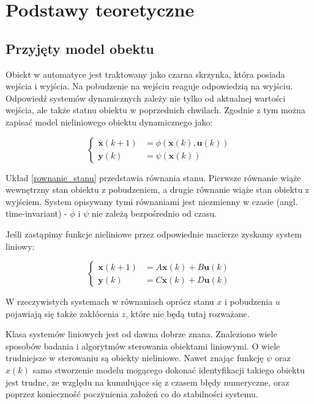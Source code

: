 \documentclass{article}
\newcommand{\bb}{\textbf}
\begin{document}
\section{Podstawy teoretyczne}

\subsection{Przyjęty model obektu}

Obiekt w automatyce jest traktowany jako czarna skrzynka, która posiada wejścia i wyjścia. Na pobudzenie na wejściu reaguje odpowiedzią na wyjściu. Odpowiedź systemów dynamicznych zależy nie tylko od aktualnej wartości wejścia, ale także statnu obiektu w poprzednich chwilach. Zgodnie z tym można zapisać model nieliniowego obiektu dynamicznego jako:

\begin{equation}
\left\{	
\begin{array}{ll}
	\bb{x}(k+1) &= \phi (\bb{x}(k), \bb{u}(k)) \\
	\bb{y}(k)   &= \psi (\bb{x}(k))
\end{array} \right.
\label{rownanie_stanu}
\end{equation}

Układ \ref{rownanie_stanu} przedstawia równania stanu. Pierwsze równanie wiąże wewnętrzny stan obiektu z pobudzeniem, a drugie równanie wiąże stan obiektu z wyjściem. System opisywany tymi równaniami jest niezmienny w czasie (angl. time-invariant) - $\phi$ i $\psi$ nie zależą bezpośrednio od czasu. 

Jeśli zastąpimy funkcje nieliniowe przez odpowiednie macierze zyskamy system liniowy:

\begin{equation}
\left\{	
\begin{array}{ll}
	\bb{x}(k+1) &= A\bb{x}(k) + B\bb{u}(k) \\
	\bb{y}(k)   &= C\bb{x}(k) + D\bb{u}(k)
\end{array} \right.
\end{equation}

W rzeczywistych systemach w równaniach oprócz stanu $x$ i pobudzenia $u$ pojawiają się także zakłócenia $z$, które nie będą tutaj rozważane.

Klasa systemów liniowych jest od dawna dobrze znana. Znaleziono wiele sposobów badania i algorytmów sterowania obiektami liniowymi. O wiele trudniejsze w sterowaniu są obiekty nieliniowe. Nawet znając funkcję $\psi$ oraz $x(k)$ samo stworzenie modelu mogącego dokonać identyfikacji takiego obiektu jest trudne, ze względu na kumulujące się z czasem błędy numeryczne, oraz poprzez konieczność poczynienia założeń co do stabilności systemu.
\end{document}
